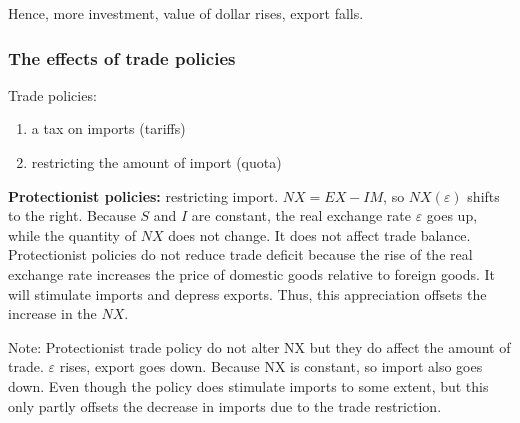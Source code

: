 \documentclass[12pt]{article}
\begin{document}
Hence, more investment, value of dollar rises, export falls.

\begin{figure}[H]
\end{figure}



\subsubsection{The effects of trade policies}

Trade policies: 
\begin{enumerate}
\item a tax on imports (tariffs)
\item restricting the amount of import (quota)
\end{enumerate}

{\textbf {Protectionist policies:}}
restricting import. $ NX = EX - IM $, so $ NX(\varepsilon) $ shifts to the right.
Because $ S $ and $ I $ are constant, the real exchange rate $ \varepsilon $ goes up,
while the quantity of $ NX $ does not change. It does not affect trade balance.
Protectionist policies do not reduce trade deficit because the rise of the real
exchange rate increases the price of domestic goods relative to foreign goods.
It will stimulate imports and depress exports. Thus, this appreciation offsets the
increase in the $ NX $.

Note: Protectionist trade policy do not alter NX but they do affect the amount of
trade.
$ \varepsilon $ rises, export goes down. Because NX is constant, so import also goes
down.
Even though the policy does stimulate imports to some extent, but this only partly 
offsets the decrease in imports due to the trade restriction.
\end{document}
